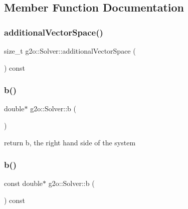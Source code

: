\subsection{Member Function Documentation}
\mbox{\label{classg2o_1_1_solver_ac32a7e75275f6595a66d948a0fc2984a}} 
\subsubsection{\texorpdfstring{additional\+Vector\+Space()}{additionalVectorSpace()}}
{\footnotesize\ttfamily size\+\_\+t g2o\+::\+Solver\+::additional\+Vector\+Space (\begin{DoxyParamCaption}{ }\end{DoxyParamCaption}) const\hspace{0.3cm}{\ttfamily [inline]}}

\mbox{\label{classg2o_1_1_solver_a3212ad9d80f8f5ad15b72c2b55000095}} 
\subsubsection{\texorpdfstring{b()}{b()}\hspace{0.1cm}{\footnotesize\ttfamily [1/2]}}
{\footnotesize\ttfamily double$\ast$ g2o\+::\+Solver\+::b (\begin{DoxyParamCaption}{ }\end{DoxyParamCaption})\hspace{0.3cm}{\ttfamily [inline]}}



return b, the right hand side of the system 

\mbox{\label{classg2o_1_1_solver_a812d5cad59fed145c3f47bcf99419a97}} 
\subsubsection{\texorpdfstring{b()}{b()}\hspace{0.1cm}{\footnotesize\ttfamily [2/2]}}
{\footnotesize\ttfamily const double$\ast$ g2o\+::\+Solver\+::b (\begin{DoxyParamCaption}{ }\end{DoxyParamCaption}) const\hspace{0.3cm}{\ttfamily [inline]}}

